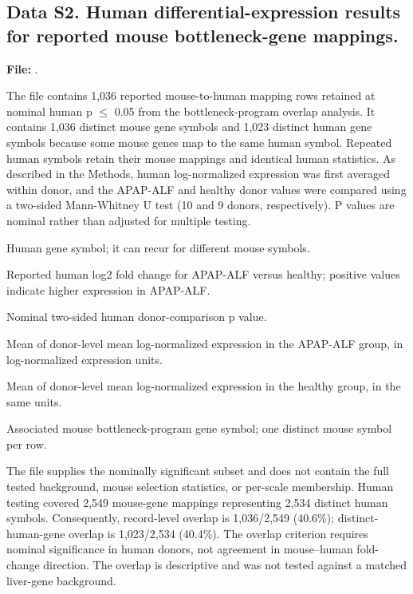 \Needspace{135pt}
\subsection*{Data S2. Human differential-expression results for reported mouse bottleneck-gene mappings.}
\label{data:S2}
\noindent\textbf{File:} .\par\smallskip
\noindent The file contains 1,036 reported mouse-to-human mapping rows retained at nominal human p \(\leq\) 0.05 from the bottleneck-program overlap analysis. It contains 1,036 distinct mouse gene symbols and 1,023 distinct human gene symbols because some mouse genes map to the same human symbol. Repeated human symbols retain their mouse mappings and identical human statistics. As described in the Methods, human log-normalized expression was first averaged within donor, and the APAP-ALF and healthy donor values were compared using a two-sided Mann-Whitney U test (10 and 9 donors, respectively). P values are nominal rather than adjusted for multiple testing.\par\smallskip
\begin{description}
\setlength{\itemsep}{1pt}\setlength{\parsep}{0pt}
\item[\texttt{human\_gene}] Human gene symbol; it can recur for different mouse symbols.
\item[\texttt{log2fc\_human}] Reported human log2 fold change for APAP-ALF versus healthy; positive values indicate higher expression in APAP-ALF.
\item[\texttt{pval\_human}] Nominal two-sided human donor-comparison p value.
\item[\texttt{mean\_alf}] Mean of donor-level mean log-normalized expression in the APAP-ALF group, in log-normalized expression units.
\item[\texttt{mean\_healthy}] Mean of donor-level mean log-normalized expression in the healthy group, in the same units.
\item[\texttt{mouse\_gene}] Associated mouse bottleneck-program gene symbol; one distinct mouse symbol per row.
\end{description}
\noindent The file supplies the nominally significant subset and does not contain the full tested background, mouse selection statistics, or per-scale membership. Human testing covered 2,549 mouse-gene mappings representing 2,534 distinct human symbols. Consequently, record-level overlap is 1,036/2,549 (40.6\%); distinct-human-gene overlap is 1,023/2,534 (40.4\%). The overlap criterion requires nominal significance in human donors, not agreement in mouse--human fold-change direction. The overlap is descriptive and was not tested against a matched liver-gene background.\par\medskip


